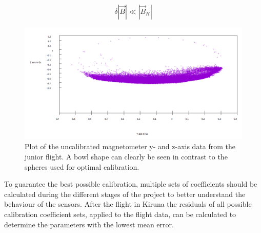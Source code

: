 \begin{equation}
    \delta |\vec{B}| \ll |\vec{B}_H|
\end{equation}

\begin{figure}[h]
    \centering
    \includegraphics[width=\linewidth]{images/06_conclusion/raw_flight_zy_bowl.png}
    \caption[Plot of the uncalibrated magnetometer data from the junior flight.]{Plot of the uncalibrated magnetometer y- and z-axis data from the junior flight. A bowl shape can clearly be seen in contrast to the spheres used for optimal calibration.}
    \label{fig:conc:flight_bowl}
\end{figure}

To guarantee the best possible calibration, multiple sets of coefficients should be calculated during the different stages of the project to better understand the behaviour of the sensors. After the flight in Kiruna the residuals of all possible calibration coefficient sets, applied to the flight data, can be calculated to determine the parameters with the lowest mean error.